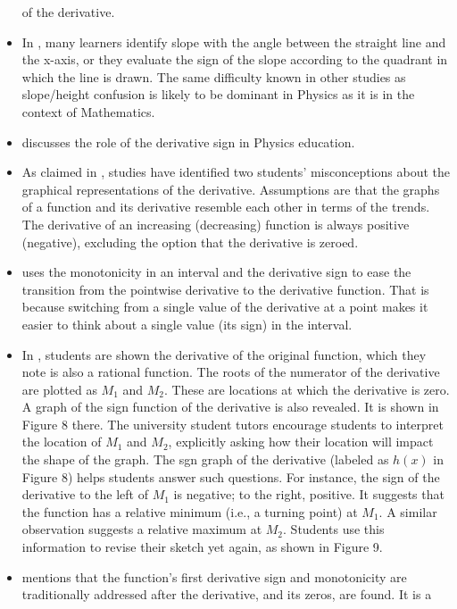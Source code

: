\documentclass[11pt]{book}
\begin{document}
\begin{itemize}
of the derivative.
\item In \cite{planinic2012comparison},
many learners identify slope with the angle between the straight line
and the x-axis, or they evaluate the sign of the slope according to
the quadrant in which the line is drawn. The same difficulty known
in other studies as slope/height confusion is likely to be dominant
in Physics as it is in the context of Mathematics.
\item \cite{christensen2012investigating}
discusses the role of the derivative sign in Physics education.
\item As claimed in \cite{hempel2018noncongruence},
studies have identified two students' misconceptions about the graphical
representations of the derivative. Assumptions are that the graphs
of a function and its derivative resemble each other in terms of the
trends. The derivative of an increasing (decreasing) function is always
positive (negative), excluding the option that the derivative is zeroed.
\item \cite{park2012transition}
uses the monotonicity in an interval and the derivative sign to ease
the transition from the pointwise derivative to the derivative function.
That is because switching from a single value of the derivative at
a point makes it easier to think about a single value (its sign) in
the interval.
\item In \cite{criscuolo2013study},
students are shown the derivative of the original function, which
they note is also a rational function. The roots of the numerator
of the derivative are plotted as $M_{1}$ and $M_{2}$. These are
locations at which the derivative is zero. A graph of the sign function
of the derivative is also revealed. It is shown in Figure 8 there.
The university student tutors encourage students to interpret the
location of $M_{1}$ and $M_{2}$, explicitly asking how their location
will impact the shape of the graph. The sgn graph of the derivative
(labeled as $h\left(x\right)$ in Figure 8) helps students answer
such questions. For instance, the sign of the derivative to the left
of $M_{1}$ is negative; to the right, positive. It suggests that
the function has a relative minimum (i.e., a \textquotedbl turning
point\textquotedbl ) at $M_{1}$. A similar observation suggests
a relative maximum at $M_{2}$. Students use this information to revise
their sketch yet again, as shown in Figure 9.
\item \cite{kostic2014extreme} mentions
that the function's first derivative sign and monotonicity are traditionally
addressed after the derivative, and its zeros, are found. It is a

\end{itemize}
\end{document}

